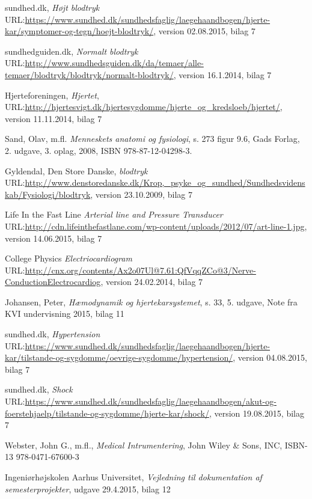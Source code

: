 \begin{thebibliography}{9}
	
	sundhed.dk,
	\emph{Højt blodtryk}
	URL:\url{https://www.sundhed.dk/sundhedsfaglig/laegehaandbogen/hjerte-kar/symptomer-og-tegn/hoejt-blodtryk/}, version 02.08.2015, bilag 7
	
	sundhedguiden.dk,
	\emph{Normalt blodtryk}
	URL:\url{http://www.sundhedsguiden.dk/da/temaer/alle-temaer/blodtryk/blodtryk/normalt-blodtryk/}, version 16.1.2014, bilag 7
	
	
	Hjerteforeningen,
	\emph{Hjertet},
	URL:\url{http://hjertesvigt.dk/hjertesygdomme/hjerte_og_kredsloeb/hjertet/},
	version 11.11.2014,
	bilag 7
	
	Sand, Olav, m.fl.
	\emph{Menneskets anatomi og fysiologi},
	s. 273 figur 9.6,
	Gads Forlag,
	2. udgave, 3. oplag,
	2008, ISBN 978-87-12-04298-3. 
	
	Gyldendal, Den Store Danske,
	\emph{blodtryk}
	URL:\url{http://www.denstoredanske.dk/Krop,_psyke_og_sundhed/Sundhedsvidenskab/Fysiologi/blodtryk},
	version 23.10.2009, 
	bilag 7
	
	Life In the Fast Line
	\emph{Arterial line and Pressure Transducer}
	URL:\url{http://cdn.lifeinthefastlane.com/wp-content/uploads/2012/07/art-line-1.jpg},
	version 14.06.2015, 
	bilag 7
	
	College Physics
	\emph{Electriocardiogram}
	URL:\url{http://cnx.org/contents/Ax2o07Ul@7.61:QfVqqZCo@3/Nerve-ConductionElectrocardiog},
	version 24.02.2014, 
	bilag 7	
	
	Johansen, Peter,
	\emph{Hæmodynamik og hjertekarsystemet},
	s. 33,
	5. udgave,
	Note fra KVI undervisning 2015,
	bilag 11
	
	sundhed.dk,
	\emph{Hypertension}
	URL:\url{https://www.sundhed.dk/sundhedsfaglig/laegehaandbogen/hjerte-kar/tilstande-og-sygdomme/oevrige-sygdomme/hypertension/},
	version 04.08.2015,
	bilag 7
	
	sundhed.dk,
	\emph{Shock}
	URL:\url{https://www.sundhed.dk/sundhedsfaglig/laegehaandbogen/akut-og-foerstehjaelp/tilstande-og-sygdomme/hjerte-kar/shock/},
	version 19.08.2015,
	bilag 7
	
	Webster, John G., m.fl.,
	\emph{Medical Intrumentering},
	John Wiley \& Sons, INC, ISBN-13 978-0471-67600-3
	 
	Ingeniørhøjskolen Aarhus Universitet,
	\emph{Vejledning til dokumentation af semesterprojekter},
	udgave 29.4.2015,
	bilag 12
	

\end{thebibliography}
